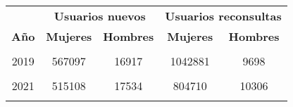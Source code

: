 \begin{tabular}[t]{ccccc}
\toprule
\multicolumn{1}{c}{\textbf{ }} & \multicolumn{2}{c}{\textbf{Usuarios nuevos}} & \multicolumn{2}{c}{\textbf{Usuarios reconsultas}} \\
\cmidrule(l{3pt}r{3pt}){2-3} \cmidrule(l{3pt}r{3pt}){4-5}
\textbf{Año} & \textbf{Mujeres} & \textbf{Hombres} & \textbf{Mujeres} & \textbf{Hombres}\\
\midrule
\cellcolor[HTML]{B6B3FF}{2018} & \cellcolor[HTML]{B6B3FF}{575437} & \cellcolor[HTML]{B6B3FF}{14132} & \cellcolor[HTML]{B6B3FF}{1041018} & \cellcolor[HTML]{B6B3FF}{7881}\\
2019 & 567097 & 16917 & 1042881 & 9698\\
\cellcolor[HTML]{B6B3FF}{2020} & \cellcolor[HTML]{B6B3FF}{534339} & \cellcolor[HTML]{B6B3FF}{15679} & \cellcolor[HTML]{B6B3FF}{970926} & \cellcolor[HTML]{B6B3FF}{9903}\\
2021 & 515108 & 17534 & 804710 & 10306\\
\cellcolor[HTML]{B6B3FF}{2022} & \cellcolor[HTML]{B6B3FF}{530699} & \cellcolor[HTML]{B6B3FF}{15551} & \cellcolor[HTML]{B6B3FF}{604890} & \cellcolor[HTML]{B6B3FF}{10426}\\
\bottomrule
\end{tabular}
